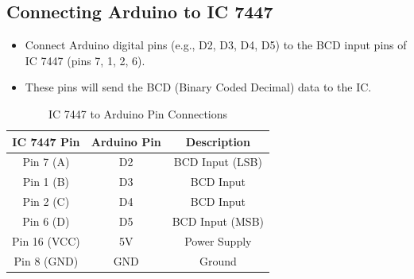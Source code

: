 \documentclass[journal]{IEEEtran}
\numberwithin{equation}{enumi}
\numberwithin{figure}{enumi}
\begin{document}
\subsection{Connecting Arduino to IC 7447}
\begin{itemize}
    \item Connect Arduino digital pins (e.g., D2, D3, D4, D5) to the BCD input pins of IC 7447 (pins 7, 1, 2, 6).
    \item These pins will send the BCD (Binary Coded Decimal) data to the IC.
\end{itemize}
\begin{table}[h!]
\centering
\begin{tabular}{|c|c|c|}
\hline
\textbf{IC 7447 Pin} & \textbf{Arduino Pin} & \textbf{Description} \\
\hline
Pin 7 (A) & D2 & BCD Input (LSB) \\
Pin 1 (B) & D3 & BCD Input \\
Pin 2 (C) & D4 & BCD Input \\
Pin 6 (D) & D5 & BCD Input (MSB) \\
Pin 16 (VCC) & 5V & Power Supply \\
Pin 8 (GND) & GND & Ground \\
\hline
\end{tabular}
\caption{IC 7447 to Arduino Pin Connections}
\end{table}
\end{document}
